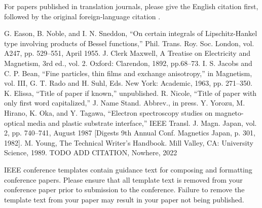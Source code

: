 \documentclass[10pt,draft,journal,a4paper,oneside,twocolumn]{IEEEtran}
\begin{document}
For papers published in translation journals, please give the English 
citation first, followed by the original foreign-language citation \cite{b6}.

\begin{thebibliography}{00}
 G. Eason, B. Noble, and I. N. Sneddon, ``On certain integrals of Lipschitz-Hankel type involving products of Bessel functions,'' Phil. Trans. Roy. Soc. London, vol. A247, pp. 529--551, April 1955.
 J. Clerk Maxwell, A Treatise on Electricity and Magnetism, 3rd ed., vol. 2. Oxford: Clarendon, 1892, pp.68--73.
 I. S. Jacobs and C. P. Bean, ``Fine particles, thin films and exchange anisotropy,'' in Magnetism, vol. III, G. T. Rado and H. Suhl, Eds. New York: Academic, 1963, pp. 271--350.
 K. Elissa, ``Title of paper if known,'' unpublished.
 R. Nicole, ``Title of paper with only first word capitalized,'' J. Name Stand. Abbrev., in press.
 Y. Yorozu, M. Hirano, K. Oka, and Y. Tagawa, ``Electron spectroscopy studies on magneto-optical media and plastic substrate interface,'' IEEE Transl. J. Magn. Japan, vol. 2, pp. 740--741, August 1987 [Digests 9th Annual Conf. Magnetics Japan, p. 301, 1982].
 M. Young, The Technical Writer's Handbook. Mill Valley, CA: University Science, 1989.
 TODO ADD CITATION, Nowhere, 2022
\end{thebibliography}
\vspace{12pt}
\color{red}
IEEE conference templates contain guidance text for composing and formatting conference papers. Please ensure that all template text is removed from your conference paper prior to submission to the conference. Failure to remove the template text from your paper may result in your paper not being published.
\end{document}
